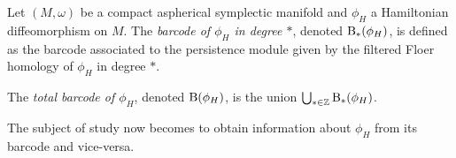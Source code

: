 \begin{definition}
Let $(M,\omega)$ be a compact aspherical symplectic manifold and $\phi_H$ a Hamiltonian diffeomorphism on $M$. The \emph{barcode of $\phi_H$ in degree $*$}, denoted $\mathrm{B}_*(\phi_H)$, is defined as the barcode associated to the persistence module given by the filtered Floer homology of $\phi_H$ in degree $*$.

The \emph{total barcode of $\phi_H$}, denoted $\mathrm{B}(\phi_H)$, is the union $\bigcup_{* \in \mathbb{Z}} \mathrm{B}_*(\phi_H)$.
\end{definition}

The subject of study now becomes to obtain information about $\phi_H$ from its barcode and vice-versa.
